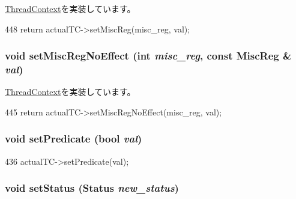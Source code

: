 \hyperlink{classThreadContext_a074166dc2fe3c4aea3ad588ed9883c51}{ThreadContext}を実装しています。


\begin{DoxyCode}
448     { return actualTC->setMiscReg(misc_reg, val); }
\end{DoxyCode}
\hypertarget{classProxyThreadContext_a763517aaea2f3decbc1ef9d064216b6f}{
\subsubsection[{setMiscRegNoEffect}]{\setlength{\rightskip}{0pt plus 5cm}void setMiscRegNoEffect (int {\em misc\_\-reg}, \/  const {\bf MiscReg} \& {\em val})}}
\label{classProxyThreadContext_a763517aaea2f3decbc1ef9d064216b6f}


\hyperlink{classThreadContext_a2987c1ff22ebdf6cdf354a31462bdbfb}{ThreadContext}を実装しています。


\begin{DoxyCode}
445     { return actualTC->setMiscRegNoEffect(misc_reg, val); }
\end{DoxyCode}
\hypertarget{classProxyThreadContext_a137a8c6cced89c2ff8387900439436b4}{
\subsubsection[{setPredicate}]{\setlength{\rightskip}{0pt plus 5cm}void setPredicate (bool {\em val})}}
\label{classProxyThreadContext_a137a8c6cced89c2ff8387900439436b4}



\begin{DoxyCode}
436     { actualTC->setPredicate(val); }
\end{DoxyCode}
\hypertarget{classProxyThreadContext_acdf331c877974ed8697216475a21998d}{
\subsubsection[{setStatus}]{\setlength{\rightskip}{0pt plus 5cm}void setStatus ({\bf Status} {\em new\_\-status})}}
\label{classProxyThreadContext_acdf331c877974ed8697216475a21998d}


